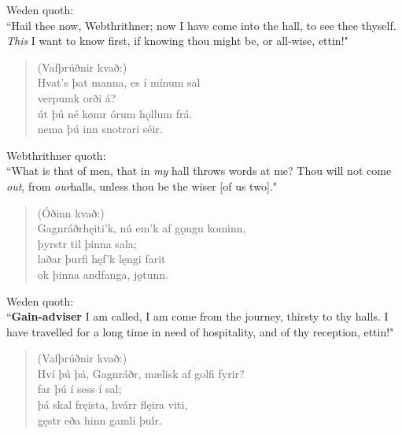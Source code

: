 \bvb Weden quoth: \\ “Hail thee now, Webthrithner; now I have come into the hall, to see thee thyself. \emph{This} I want to know first, if knowing thou might be, or all-wise, ettin!" \\

\begin{verse}
(Vafþrúðnir kvað:) \\%
\bva Hvat's þat manna, \hld es í mínum sal \\%
\ind verpumk orði á? \\%
út þú né kømr \hld órum hǫllum frá. \\%
\ind nema þú inn snotrari séir.\\%
\end{verse}

\bvb Webthrithner quoth: \\ “What is that of men\footnotemark[10], that in \emph{my} hall throws words at me? Thou will not come \emph{out}, from \emph{our}\footnotemark[11] halls, unless thou be the wiser [of us two]." \\

\begin{verse}
(Óðinn kvað:) \\%
\bva Gagnráðr\footnotemark[5] hęiti'k, \hld nú em'k af gǫngu kominn, \\%
\ind þyrstr til þinna sala; \\%
laðar þurfi \hld hęf'k lęngi farit \\%
\ind ok þinna andfanga, jǫtunn.\\%
\end{verse}

\bvb Weden quoth: \\ “\textbf{Gain-adviser} I am called, I am come from the journey, thirsty to thy halls. I have travelled for a long time in need of hospitality, and of thy reception, ettin!" \\

\begin{verse}
(Vafþrúðnir kvað:) \\%
\bva Hví þú þá, Gagnráðr, \hld mælisk af golfi fyrir? \\%
\ind far þú í sess í sal; \\%
þá skal fręista, \hld hvárr flęira viti, \\%
\ind gęstr eða hinn gamli þulr.\\%
\end{verse}

